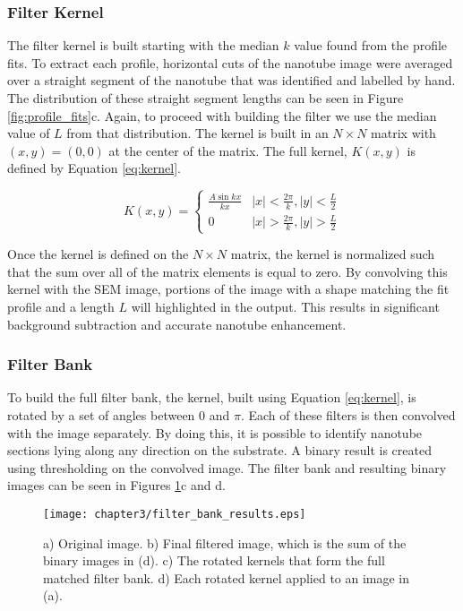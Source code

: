\subsubsection{Filter Kernel}

The filter kernel is built starting with the median $k$ value found from the profile fits. To extract each profile, horizontal cuts of the nanotube image were averaged over a straight segment of the nanotube that was identified and labelled by hand. The distribution of these straight segment lengths can be seen in Figure \ref{fig:profile_fits}c. Again, to proceed with building the filter we use the median value of $L$ from that distribution. The kernel is built in an $N \times N$ matrix with $(x,y) = (0,0)$ at the center of the matrix. The full kernel, $K(x,y)$ is defined by Equation \ref{eq:kernel}.

\begin{equation} 
\label{eq:kernel}
K(x,y) = \begin{cases} \frac{A\sin{kx}}{kx} & |x| < \frac{2\pi}{k}, |y| < \frac{L}{2} \\ 
                       0                    & |x| > \frac{2\pi}{k},  |y| > \frac{L}{2}
       \end{cases}
\end{equation}

Once the kernel is defined on the $N \times N$ matrix, the kernel is normalized such that the sum over all of the matrix elements is equal to zero. By convolving this kernel with the SEM image, portions of the image with a shape matching the fit profile and a length $L$ will highlighted in the output. This results in significant background subtraction and accurate nanotube enhancement. 

\subsubsection{Filter Bank}

To build the full filter bank, the kernel, built using Equation \ref{eq:kernel}, is rotated by a set of angles between $0$ and $\pi$. Each of these filters is then convolved with the image separately. By doing this, it is possible to identify nanotube sections lying along any direction on the substrate. A binary result is created using thresholding on the convolved image. The filter bank and resulting binary images can be seen in Figures \ref{fig:filter_bank_results}c and d. 

\begin{figure}
	\centering
	\texttt{[image: chapter3/filter\_bank\_results.eps]}
	\caption{a) Original image. b) Final filtered image, which is the sum of the binary images in (d). c) The rotated kernels that form the full matched filter bank. d) Each rotated kernel applied to an image in (a).}
	\label{fig:filter_bank_results}
\end{figure}


